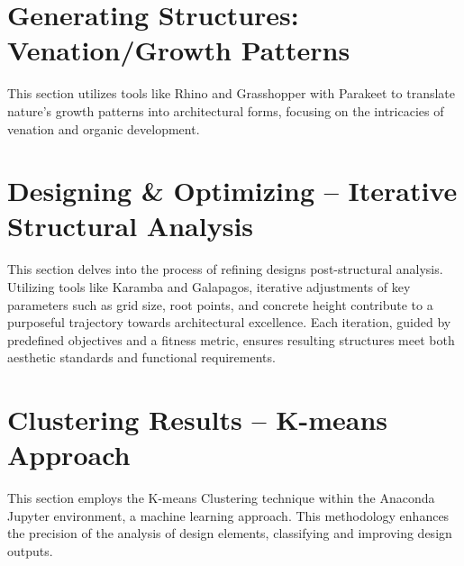 \section*{
  Generating Structures: Venation/Growth Patterns
 }
This section utilizes tools like Rhino and Grasshopper with Parakeet to translate nature's growth patterns into architectural forms, focusing on the intricacies of venation and organic development.
\vspace*{0.125cm}

\columnbreak%
\begin{minipage}[t][\textheight][t]{\linewidth}
	\section*{
	  Designing \& Optimizing -- Iterative Structural Analysis
	 }
	This section delves into the process of refining designs post-structural analysis. Utilizing tools like Karamba and Galapagos, iterative adjustments of key parameters such as grid size, root points, and concrete height contribute to a purposeful trajectory towards architectural excellence. Each iteration, guided by predefined objectives and a fitness metric, ensures resulting structures meet both aesthetic standards and functional requirements.
	\vfill
	
	\vfill
	\section*{
	  Clustering Results -- K-means Approach
	 }
	\vfill
	This section employs the K-means Clustering technique within the Anaconda Jupyter environment, a machine learning approach. This methodology enhances the precision of the analysis of design elements, classifying and improving design outputs.
	\vfill
	
\end{minipage}
\EndTwoColumnLayout
\newpage
